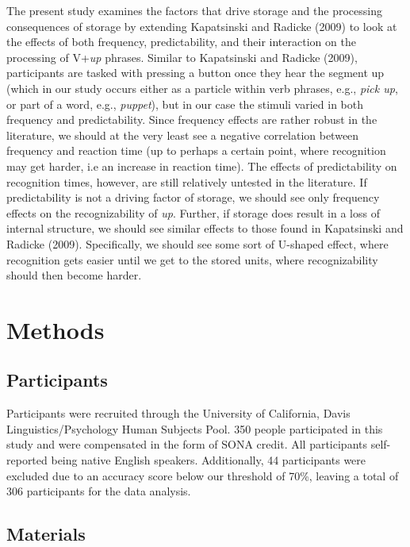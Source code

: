 \documentclass[
  man,floatsintext]{apa6}
\begin{document}
The present study examines the factors that drive storage and the processing consequences of storage by extending Kapatsinski and Radicke (2009) to look at the effects of both frequency, predictability, and their interaction on the processing of V+\emph{up} phrases. Similar to Kapatsinski and Radicke (2009), participants are tasked with pressing a button once they hear the segment up (which in our study occurs either as a particle within verb phrases, e.g., \emph{pick up}, or part of a word, e.g., \emph{puppet}), but in our case the stimuli varied in both frequency and predictability. Since frequency effects are rather robust in the literature, we should at the very least see a negative correlation between frequency and reaction time (up to perhaps a certain point, where recognition may get harder, i.e an increase in reaction time). The effects of predictability on recognition times, however, are still relatively untested in the literature. If predictability is not a driving factor of storage, we should see only frequency effects on the recognizability of \emph{up}. Further, if storage does result in a loss of internal structure, we should see similar effects to those found in Kapatsinski and Radicke (2009). Specifically, we should see some sort of U-shaped effect, where recognition gets easier until we get to the stored units, where recognizability should then become harder.

\section{Methods}\label{methods}

\subsection{Participants}\label{participants}

Participants were recruited through the University of California, Davis Linguistics/Psychology Human Subjects Pool. 350 people participated in this study and were compensated in the form of SONA credit. All participants self-reported being native English speakers. Additionally, 44 participants were excluded due to an accuracy score below our threshold of 70\%, leaving a total of 306 participants for the data analysis.

\subsection{Materials}\label{materials}
\end{document}
